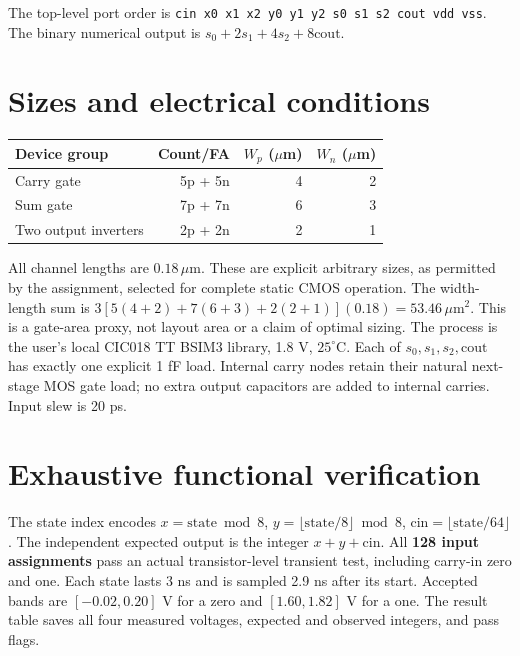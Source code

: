 \documentclass[11pt,a4paper]{article}
\begin{document}
\begin{center}\end{center}
The top-level port order is
\texttt{cin x0 x1 x2 y0 y1 y2 s0 s1 s2 cout vdd vss}.
The binary numerical output is $s_0+2s_1+4s_2+8\mathrm{cout}$.

\section*{Sizes and electrical conditions}
\begin{center}\begin{tabular}{lrrr}
\toprule Device group&Count/FA&$W_p$ ($\mu$m)&$W_n$ ($\mu$m)\\\midrule
Carry gate&5p + 5n&4&2\\
Sum gate&7p + 7n&6&3\\
Two output inverters&2p + 2n&2&1\\\bottomrule
\end{tabular}\end{center}
All channel lengths are $0.18\,\mu$m. These are explicit arbitrary sizes,
as permitted by the assignment, selected for complete static CMOS operation.
The width-length sum is
$3[5(4+2)+7(6+3)+2(2+1)](0.18)=53.46\,\mu\mathrm{m}^2$.
This is a gate-area proxy, not layout area or a claim of optimal sizing.
The process is the user's local CIC018 TT BSIM3 library, 1.8 V, $25^\circ$C.
Each of $s_0,s_1,s_2,\mathrm{cout}$ has exactly one explicit 1 fF load.
Internal carry nodes retain their natural next-stage MOS gate load; no
extra output capacitors are added to internal carries. Input slew is 20 ps.

\section*{Exhaustive functional verification}
The state index encodes
$x=\mathrm{state}\bmod8$, $y=\lfloor\mathrm{state}/8\rfloor\bmod8$,
$\mathrm{cin}=\lfloor\mathrm{state}/64\rfloor$.
The independent expected output is the integer $x+y+\mathrm{cin}$.
All \textbf{128 input assignments} pass an actual transistor-level transient
test, including carry-in zero and one. Each state lasts 3 ns and is sampled
2.9 ns after its start. Accepted bands are $[-0.02,0.20]$ V for a zero and
$[1.60,1.82]$ V for a one. The result table saves all four measured voltages,
expected and observed integers, and pass flags.
\end{document}
